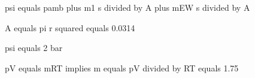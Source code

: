 psi equals pamb plus m1 s divided by A plus mEW s divided by A

A equals pi r squared equals 0.0314

psi equals 2 bar

pV equals mRT implies m equals pV divided by RT equals 1.75